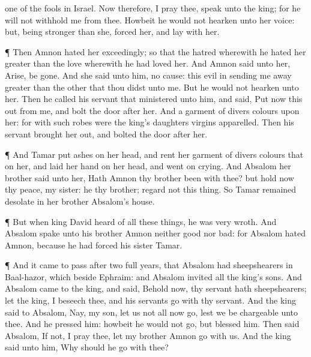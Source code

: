 {one of the
fools in
Israel. Now therefore, I pray thee,
speak unto the
king; for he will not
withhold me from thee.
Howbeit he
would not
hearken unto her
voice: but, being
stronger than she,
forced her, and
lay with her.
\par }{\PP {}¶ Then
Amnon
hated her
exceedingly; so that the
hatred wherewith he
hated her
{}
greater than the
love wherewith he had
loved her. And
Amnon
said unto her,
Arise, be
gone.
And she
said unto him,
{} no
cause: this
evil in sending me
away
{}
greater than the
other that thou
didst unto me. But he
would not
hearken unto her.
Then he
called his
servant that
ministered unto him, and
said,
Put now this
{}
out from me, and
bolt the
door
after her.
And
{} a
garment of divers
colours upon her: for with such
robes were the
king’s
daughters
{}
virgins
apparelled. Then his
servant
brought her
out, and
bolted the
door
after her.
\par }{\PP {}¶ And
Tamar
put
ashes on her
head, and
rent her
garment of divers
colours that
{} on her, and
laid her
hand on her
head, and
went
on
crying.
And
Absalom her
brother
said unto her, Hath
Amnon thy
brother been with thee? but hold now thy
peace, my
sister: he
{} thy
brother;
regard not this
thing. So
Tamar
remained
desolate in her
brother
Absalom’s
house.
\par }{\PP {}¶ But when
king
David
heard of all these
things, he was
very
wroth.
And
Absalom
spake unto his brother
Amnon neither
good nor
bad: for
Absalom
hated
Amnon,
because he had
forced his
sister
Tamar.
\par }{\PP {}¶ And it came to pass after two
full
years, that
Absalom had
sheepshearers in
Baal-hazor, which
{} beside
Ephraim: and
Absalom
invited all the
king’s
sons.
And
Absalom
came to the
king, and
said, Behold now, thy
servant hath
sheepshearers;
let the
king, I beseech thee, and his
servants
go with thy
servant.
And the
king
said to
Absalom, Nay, my
son, let us not all now
go, lest we be
chargeable unto thee. And he
pressed him: howbeit he
would not
go, but
blessed him.
Then
said
Absalom, If not, I pray thee, let my
brother
Amnon
go with us. And the
king
said unto him, Why should he
go with thee?
}
